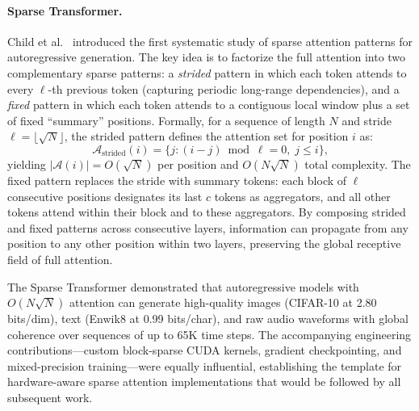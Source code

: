 \paragraph{Sparse Transformer.}
Child et al.~\cite{child2019generating} introduced the first systematic study of sparse attention patterns for autoregressive generation. The key idea is to factorize the full attention into two complementary sparse patterns: a \emph{strided} pattern in which each token attends to every $\ell$-th previous token (capturing periodic long-range dependencies), and a \emph{fixed} pattern in which each token attends to a contiguous local window plus a set of fixed ``summary'' positions. Formally, for a sequence of length $N$ and stride $\ell = \lfloor\sqrt{N}\rfloor$, the strided pattern defines the attention set for position $i$ as:
\begin{equation}
\mathcal{A}_{\text{strided}}(i) = \{j : (i - j) \bmod \ell = 0,\; j \leq i\},
\label{eq:sparse-strided}
\end{equation}
yielding $|\mathcal{A}(i)| = O(\sqrt{N})$ per position and $O(N\sqrt{N})$ total complexity. The fixed pattern replaces the stride with summary tokens: each block of $\ell$ consecutive positions designates its last $c$ tokens as aggregators, and all other tokens attend within their block and to these aggregators. By composing strided and fixed patterns across consecutive layers, information can propagate from any position to any other position within two layers, preserving the global receptive field of full attention.

The Sparse Transformer demonstrated that autoregressive models with $O(N\sqrt{N})$ attention can generate high-quality images (CIFAR-10 at 2.80 bits/dim), text (Enwik8 at 0.99 bits/char), and raw audio waveforms with global coherence over sequences of up to 65K time steps. The accompanying engineering contributions---custom block-sparse CUDA kernels, gradient checkpointing, and mixed-precision training---were equally influential, establishing the template for hardware-aware sparse attention implementations that would be followed by all subsequent work.


